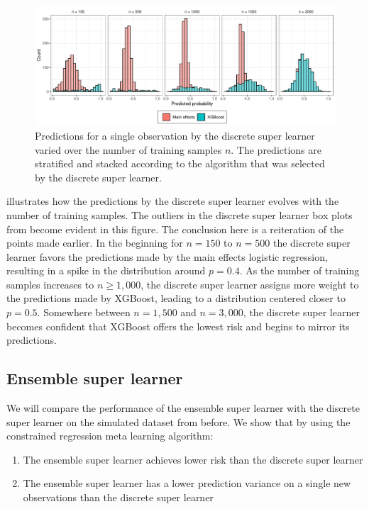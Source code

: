 \documentclass[./main.tex]{subfiles}
\begin{document}
\begin{figure}[H]
    \centering
    \includegraphics[width=\textwidth]{figures/preds_dsl_shift.pdf}
    \caption{Predictions for a single observation by the discrete super learner varied over the number of training samples $ n $. The predictions are stratified and stacked according to the algorithm that was selected by the discrete super learner.} 
    \label{fig:dsl_shift}
\end{figure}
 illustrates how the predictions by the discrete super learner evolves with the number of training samples. The outliers in the discrete super learner box plots from  become evident in this figure. The conclusion here is a reiteration of the points made earlier. In the beginning for $ n = 150 $ to $ n = 500 $ the discrete super learner favors the predictions made by the main effects logistic regression, resulting in a spike in the distribution around $ p = 0.4 $. As the number of training samples increases to $n \geq 1,000$, the discrete super learner assigns more weight to the predictions made by XGBoost, leading to a distribution centered closer to $p = 0.5$. Somewhere between $n = 1,500$ and $n = 3,000$, the discrete super learner becomes confident that XGBoost offers the lowest risk and begins to mirror its predictions.

\subsection{Ensemble super learner} \label{sim_esl}
We will compare the performance of the ensemble super learner with the discrete super learner on the simulated dataset from before. We show that by using the constrained regression meta learning algorithm:
\begin{enumerate}
    \item The ensemble super learner achieves lower risk than the discrete super learner
    \item The ensemble super learner has a lower prediction variance on a single new observations than the discrete super learner
\end{enumerate}
\end{document}

